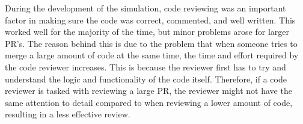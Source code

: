     During the development of the simulation, code reviewing was an important factor in making sure the code was correct, commented, and well written. This worked well for the majority of the time, but minor problems arose for larger PR's. The reason behind this is due to the problem that when someone tries to merge a large amount of code at the same time, the time and effort required by the code reviewer increases. This is because the reviewer first has to try and understand the logic and functionality of the code itself. Therefore, if a code reviewer is tasked with reviewing a large PR, the reviewer might not have the same attention to detail compared to when reviewing a lower amount of code, resulting in a less effective review. 



        